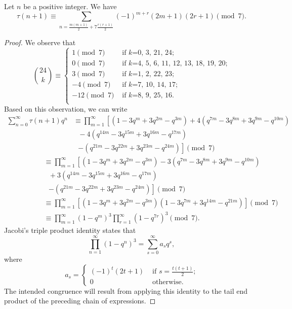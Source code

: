 \documentclass[10pt,a4paper]{amsart}
\begin{document}
\begin{theorem}\label{taumodulo7}
Let $n$ be a positive integer. We have
\begin{equation}
\tau(n+1)\equiv \sum_{n=\frac{m(m+1)}{2}+7\frac{r(r+1)}{2}}(-1)^{m+r}(2m+1)(2r+1)\pmod{7}.
\end{equation}
\end{theorem}

\begin{proof}
We observe that
\[
{24\choose{k}}\equiv \begin{cases}
1\pmod{7}&\text{ if $k$=0, 3, 21, 24;}\\ 
0\pmod{7}&\text{ if $k$=4, 5, 6, 11, 12, 13, 18, 19, 20;}\\
3\pmod{7}&\text{ if $k$=1, 2, 22, 23;}\\
-4\pmod{7}&\text{ if $k$=7, 10, 14, 17;}\\
-12\pmod{7}&\text{ if $k$=8, 9, 25, 16.}\\
\end{cases}
\]
Based on this observation, we can write 
\begin{align*}
\sum_{n=0}^{\infty}\tau(n+1)q^n
&\equiv\prod_{m=1}^{\infty} \left[\left(1-3q^m+3q^{2m}-q^{3m}\right)+4\left(q^{7m}-3q^{8m}+3q^{9m}-q^{10m}\right)\right.\\
&\text{\ \ \ \ \ \ \ \ }-4\left(q^{14m}-3q^{15m}+3q^{16m}-q^{17m}\right)\\
&\text{\ \ \ \ \ \ \ \ }\left.-\left(q^{21m}-3q^{22m}+3q^{23m}-q^{24m}\right)\right]\pmod{7}
\end{align*}
\begin{align*}
\ \ \ \ \ \ \ \ \ \ \ \ \ \ \ \ \ \ \ \ &\equiv\prod_{m=1}^{\infty}\left[\left(1-3q^m+3q^{2m}-q^{3m}\right)-3\left(q^{7m}-3q^{8m}+3q^{9m}-q^{10m}\right)\right.\\
&\text{\ \ \ \ \ \ \ \ }+3\left(q^{14m}-3q^{15m}+3q^{16m}-q^{17m}\right)\\
&\text{\ \ \ \ \ \ \ \ }\left.-\left(q^{21m}-3q^{22m}+3q^{23m}-q^{24m}\right)\right]\pmod{7}\\
&\equiv\prod_{m=1}^{\infty}\left[\left(1-3q^m+3q^{2m}-q^{3m}\right)\left(1-3q^{7m}+3q^{14m}-q^{21m}\right)\right]\pmod{7}\\ 
&\equiv\prod_{m=1}^{\infty}\left(1-q^{m}\right) ^3 \prod_{r=1}^{\infty}\left(1-q^{7r}\right)^3\pmod{7}.
\end{align*}
Jacobi's triple product identity states that
\begin{equation}\label{JTPI}
\prod_{n=1}^{\infty}(1-q^n)^3=\sum_{s=0}^{\infty}a_sq^s,
\end{equation}
where 
\[a_s=\begin{cases}
(-1)^t(2t+1)&\text{ if $s=\frac{t(t+1)}{2}$;}\\
0&\text{ otherwise.}
\end{cases}
\]
The intended congruence will result from applying this identity to the tail end product of the preceding chain of expressions.
\end{proof}
\end{document}
